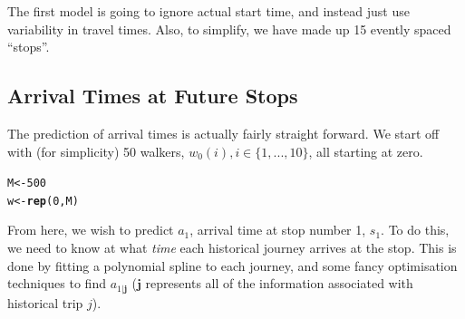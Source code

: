 \documentclass[11pt]{article}\usepackage[]{graphicx}\usepackage[]{color}
\makeatletter
\newcommand{\hlnum}[1]{\textcolor[rgb]{0.686,0.059,0.569}{#1}}%
\newcommand{\hlstd}[1]{\textcolor[rgb]{0.345,0.345,0.345}{#1}}%
\newcommand{\hlkwb}[1]{\textcolor[rgb]{0.69,0.353,0.396}{#1}}%
\newcommand{\hlkwd}[1]{\textcolor[rgb]{0.737,0.353,0.396}{\textbf{#1}}}%
\newenvironment{kframe}{%
 \def\at@end@of@kframe{}%
 \ifinner\ifhmode%
  \def\at@end@of@kframe{\end{minipage}}%
  \begin{minipage}{\columnwidth}%
 \fi\fi%
 \def\FrameCommand##1{\hskip\@totalleftmargin \hskip-\fboxsep
 \colorbox{shadecolor}{##1}\hskip-\fboxsep
     \hskip-\linewidth \hskip-\@totalleftmargin \hskip\columnwidth}%
 \MakeFramed {\advance\hsize-\width
   \@totalleftmargin\z@ \linewidth\hsize
   \@setminipage}}%
 {\par\unskip\endMakeFramed%
 \at@end@of@kframe}
\newenvironment{knitrout}{}{} %
\makeatother
\begin{document}
The first model is going to ignore actual start time, and instead just use variability in travel times.
Also, to simplify, we have made up 15 evently spaced ``stops''.



\subsection{Arrival Times at Future Stops}
\label{sec:future_arrival_times}


The prediction of arrival times is actually fairly straight forward.
We start off with (for simplicity) 50 walkers, $w_0(i), i \in \{1,...,10\}$, 
all starting at zero.

\begin{knitrout}
\color{fgcolor}\begin{kframe}
\begin{alltt}
\hlstd{M} \hlkwb{<-} \hlnum{500}
\hlstd{w} \hlkwb{<-} \hlkwd{rep}\hlstd{(}\hlnum{0}\hlstd{, M)}
\end{alltt}
\end{kframe}
\end{knitrout}

From here, we wish to predict $a_1$, arrival time at stop number 1, $s_1$.
To do this, we need to know at what \emph{time} each historical journey arrives at the stop.
This is done by fitting a polynomial spline to each journey, 
and some fancy optimisation techniques to find $a_{1|\boldsymbol{j}}$ 
($\boldsymbol{j}$ represents all of the information associated with historical trip $j$).
\end{document}
